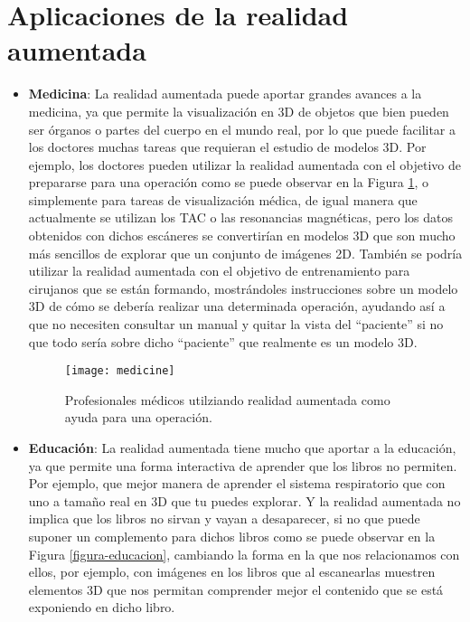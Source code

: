 \section{Aplicaciones de la realidad aumentada}
\begin{itemize}
  \item \textbf{Medicina}: La realidad aumentada puede aportar grandes avances a la medicina, ya que permite la visualización en 3D de objetos que bien pueden ser órganos o partes del cuerpo en el mundo real, por lo que puede facilitar a los doctores muchas tareas que requieran el estudio de modelos 3D. Por ejemplo, los doctores pueden utilizar la realidad aumentada con el objetivo de prepararse para una operación como se puede observar en la Figura \ref{figura-medicina}, o simplemente para tareas de visualización médica, de igual manera que actualmente se utilizan los TAC o las resonancias magnéticas, pero los datos obtenidos con dichos escáneres se convertirían en modelos 3D que son mucho más sencillos de explorar que un conjunto de imágenes 2D. También se podría utilizar la realidad aumentada con el objetivo de entrenamiento para cirujanos que se están formando, mostrándoles instrucciones sobre un modelo 3D de cómo se debería realizar una determinada operación, ayudando así a que no necesiten consultar un manual y quitar la vista del “paciente” si no que todo sería sobre dicho “paciente” que realmente es un modelo 3D. \cite{azuma}

  \begin{figure}[h]
    \centering
    \texttt{[image: medicine]}
    \caption{Profesionales médicos utilziando realidad aumentada como ayuda para una operación.\protect\footnotemark}
    \label{figura-medicina}
  \end{figure}


  \newpage

  \item \textbf{Educación}: La realidad aumentada tiene mucho que aportar a la educación, ya que permite una forma interactiva de aprender que los libros no permiten. Por ejemplo, que mejor manera de aprender el sistema respiratorio que con uno a tamaño real en 3D que tu puedes explorar. Y la realidad aumentada no implica que los libros no sirvan y vayan a desaparecer, si no que puede suponer un complemento para dichos libros como se puede observar en la Figura \ref{figura-educacion}, cambiando la forma en la que nos relacionamos con ellos, por ejemplo, con imágenes en los libros que al escanearlas muestren elementos 3D que nos permitan comprender mejor el contenido que se está exponiendo en dicho libro. \cite{reinoso}


\end{itemize}

